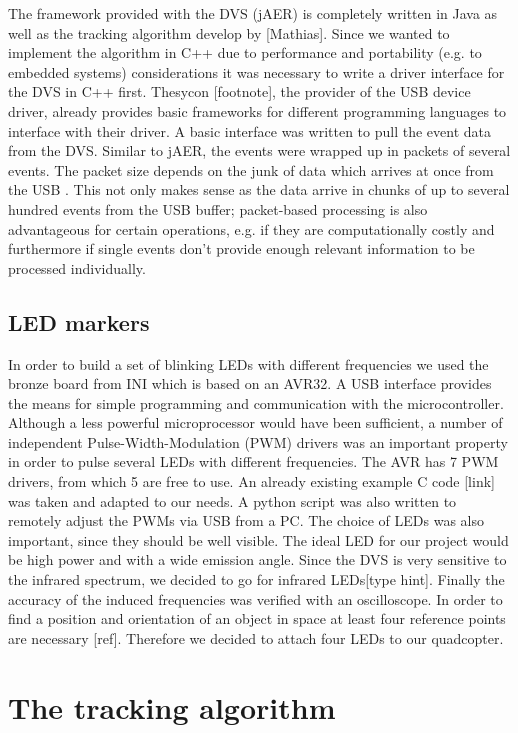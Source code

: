The framework provided with the DVS (jAER) is completely written in Java as well as the tracking algorithm develop by [Mathias]. Since we wanted to implement the algorithm in C++ due to performance and portability (e.g. to embedded systems) considerations it was necessary to write a driver interface for the DVS in C++ first. Thesycon [footnote], the provider of the USB device driver, already provides basic frameworks for different programming languages to interface with their driver.  A basic interface was written to pull the event data from the DVS. Similar to jAER, the events were wrapped up in packets of several events. The packet size depends on the junk of data which arrives at once from the USB . This not only makes sense as the data arrive in chunks of up to several hundred events from the USB buffer; packet-based processing is also advantageous for certain operations, e.g. if they are computationally costly and furthermore if single events don’t provide enough relevant information to be processed individually. 

\subsection{LED markers}\label{sec:leds}

In order to build a set of blinking LEDs with different frequencies we used the bronze board from INI which is based on an AVR32. A USB interface provides the means for simple programming and communication with the microcontroller. Although a less powerful microprocessor would have been sufficient, a number of independent Pulse-Width-Modulation (PWM) drivers was an important property in order to pulse several LEDs with different frequencies. The AVR has 7 PWM drivers, from which 5 are free to use.  An already existing example C code [link] was taken and adapted to our needs. A python script was also written to remotely adjust the PWMs via USB from a PC. 
The choice of LEDs was also important, since they should be well visible. The ideal LED for our project would be high power and with a wide emission angle. Since the DVS is very sensitive to the infrared spectrum, we decided to go for infrared LEDs[type hint]. Finally the accuracy of the induced frequencies was verified with an oscilloscope. In order to find a position and orientation of an object in space at least four reference points are necessary [ref]. Therefore we decided to attach four LEDs to our quadcopter.


\section{The tracking algorithm}\label{sec:tracking}

